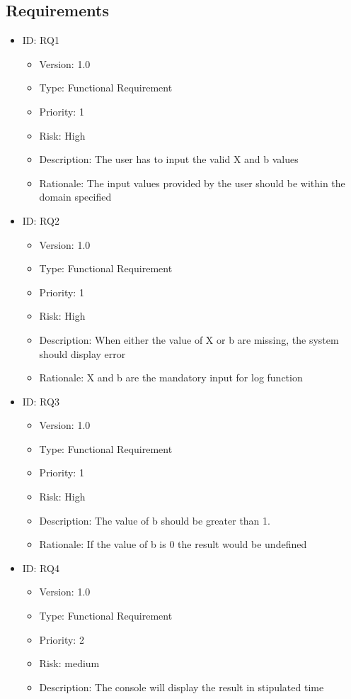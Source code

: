 \documentclass[12pt]{report}
\begin{document}
\subsection{Requirements}
\begin{itemize}
\item ID: RQ1
\begin{itemize}
\item Version:  1.0
\item Type: Functional Requirement
\item Priority: 1
\item Risk: High
\item Description: The user has to input the valid X and b values
\item Rationale: The input values provided by the user should be within the domain specified
\end{itemize}
\item ID: RQ2
\begin{itemize}
\item Version:  1.0
\item Type: Functional Requirement
\item Priority: 1
\item Risk: High
\item Description: When either the value of X or b are missing, the system should display error
\item Rationale: X and b are the mandatory input for log function
\end{itemize}
\item ID: RQ3
\begin{itemize}
\item Version:  1.0
\item Type: Functional Requirement
\item Priority: 1
\item Risk: High
\item Description: The value of b should be greater than 1.
\item Rationale: If the value of b is 0 the result would be undefined
\end{itemize}
\item ID: RQ4
\begin{itemize}
\item Version:  1.0
\item Type: Functional Requirement
\item Priority: 2
\item Risk: medium
\item Description: The console will display the result in stipulated time

\end{itemize}
\end{itemize}
\end{document}

